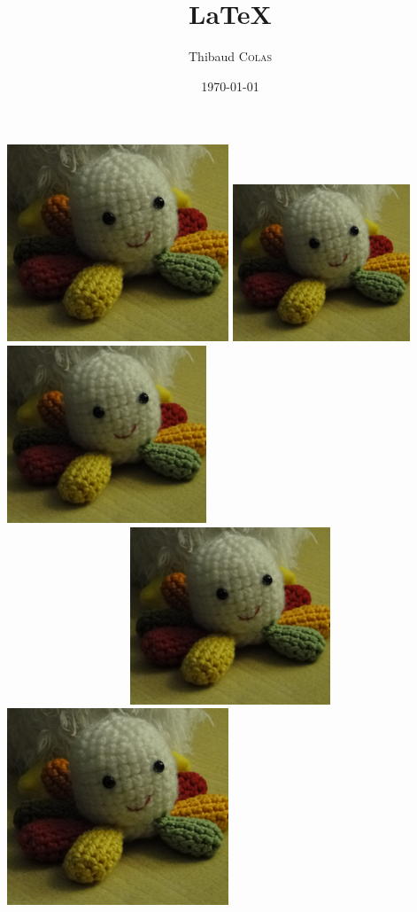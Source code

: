 \documentclass{article}
\author{Thibaud \textsc{Colas}}
\date{\today}
\title{\LaTeX}
\begin{document}
\maketitle
\includegraphics{poulpy.png}
\includegraphics[width=200px]{poulpy.png}
\includegraphics[height=200px]{poulpy.png}
\includegraphics[height=200px, width=600px]{poulpy.png}  %
\includegraphics[scale=1.5]{poulpy.png}  %
	
\end{document}
